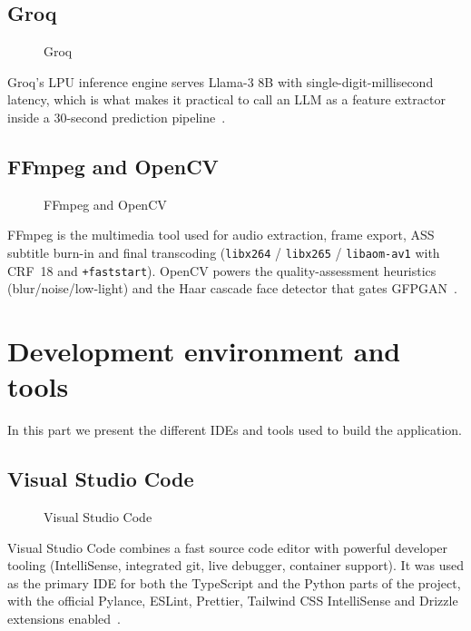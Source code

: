 \subsection{Groq}
\label{sec:groq}
\begin{figure}[H]
  \centering
  \caption{Groq}
  \label{fig:groq}
\end{figure}
Groq's LPU inference engine serves Llama-3 8B with single-digit-millisecond latency, which
is what makes it practical to call an LLM as a feature extractor inside a 30-second
prediction pipeline~\cite{groq}.

\subsection{FFmpeg and OpenCV}
\label{sec:ffmpeg}
\begin{figure}[H]
  \centering
  \caption{FFmpeg and OpenCV}
  \label{fig:ffmpeg}
\end{figure}
FFmpeg is the multimedia tool used for audio extraction, frame export, ASS subtitle burn-in
and final transcoding (\texttt{libx264} / \texttt{libx265} / \texttt{libaom-av1} with CRF~18
and \texttt{+faststart}). OpenCV powers the quality-assessment heuristics
(blur/noise/low-light) and the Haar cascade face detector that gates GFPGAN~\cite{ffmpeg,opencv}.

\section{Development environment and tools}
\label{sec:dev_env}

In this part we present the different IDEs and tools used to build the application.

\subsection{Visual Studio Code}
\label{sec:vscode}
\begin{figure}[H]
  \centering
  \caption{Visual Studio Code}
  \label{fig:vscode}
\end{figure}
Visual Studio Code combines a fast source code editor with powerful developer tooling
(IntelliSense, integrated git, live debugger, container support). It was used as the primary
IDE for both the TypeScript and the Python parts of the project, with the official Pylance,
ESLint, Prettier, Tailwind CSS IntelliSense and Drizzle extensions enabled~\cite{vscode}.


